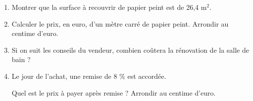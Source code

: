 	\begin{enumerate}
		\item Montrer que la surface à recouvrir de papier peint est de 26,4 m$^2$.
		
		\item Calculer le prix, en euro, d'un mètre carré de papier peint.
		Arrondir au centime d'euro.
		
		\item Si on suit les conseils du vendeur, combien coûtera la rénovation de la salle de bain ?
		
		\item Le jour de l'achat, une remise de 8 \% est accordée.
		
		Quel est le prix à payer après remise ? Arrondir au centime d'euro.
	\end{enumerate}

